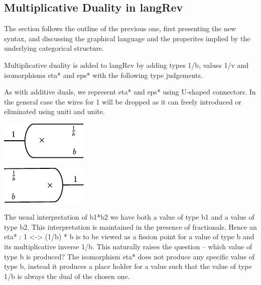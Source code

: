 \documentclass[preprint]{sigplanconf}
\begin{document}
\subsection{Multiplicative Duality in {{langRev}} }
\label{sec:frac}

The section follows the outline of the previous one, first presenting the new
syntax, and discussing the graphical language and the properites implied by
the underlying categorical structure.

Multiplicative duality is added to {{langRev}} by adding types
{{1/b}}, values {{1/v}} and isomorphisms {{eta*}} and {{eps*}} with
the following type judgements.

%

\vspace{-15pt}
\begin{multicols}{2}

\end{multicols}

As with additive duals, we represent {{eta*}} and {{eps*}} using
U-shaped connectors. In the general case the wires for {{1}} will be
dropped as it can freely introduced or eliminated using {{uniti}} and
{{unite}}. 

\begin{multicols}{2}
\begin{center}
  \includegraphics{diagrams/eta_times.pdf}
\end{center}
  
\begin{center}
  \includegraphics{diagrams/eps_times.pdf}
\end{center}
\end{multicols}

The usual interpretation of {{b1*b2}} we have both a value of type
{{b1}} and a value of type {{b2}}. This interpretation is maintained
in the presence of fractionals. Hence an {{eta* : 1 <-> (1/b) * b}} is
to be viewed as a fission point for a value of type {{b}} and its
multiplicative inverse {{1/b}}. This naturally raises the question --
which value of type {{b}} is produced? The isomorphism {{eta*}} does
not produce any specific value of type {{b}}, instead it produces a
place holder for a value such that the value of type {{1/b}} is
always the dual of the chosen one. 
\end{document}
